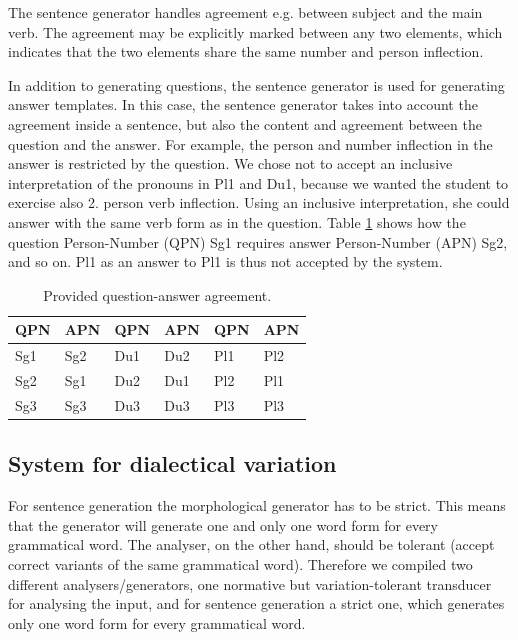 \documentclass[11pt]{article}
\begin{document}
The sentence generator handles agreement e.g. between subject and the main verb. The agreement may be explicitly marked between any two elements, which indicates that the two elements share the same number and person inflection.

In addition to generating questions, the sentence generator is used for generating answer templates. In this case, the sentence generator takes into account the agreement inside a sentence, but also the content and agreement between the question and the answer. For example, the person and number inflection in the answer is restricted by the question. We chose not to accept an inclusive interpretation of the pronouns in Pl1 and Du1, because we wanted the student to exercise also 2. person verb inflection. Using an inclusive interpretation, she could answer with the same verb form as in the question. Table \ref{QA} shows how the question Person-Number (QPN) Sg1 requires answer Person-Number (APN) Sg2, and so on. Pl1 as an answer to Pl1 is thus not accepted by the system.\\


\begin{table}[htdp]
\caption{Provided question-answer agreement.}
\begin{center}
\begin{tabular}[t]{ll|ll|ll}
QPN &APN &QPN &APN &QPN &APN \\
\hline
Sg1 &Sg2 &Du1 &Du2 &Pl1 &Pl2 \\
Sg2 &Sg1 &Du2 &Du1 &Pl2 &Pl1 \\
Sg3 &Sg3 &Du3 &Du3 &Pl3 &Pl3 \\
\hline
\end{tabular}
\end{center}
\label{QA}
\end{table}

\subsection{System for dialectical variation}\label{dialect}
For sentence generation the morphological generator has to be strict. This means that the generator will generate one and only one word form for every grammatical word. The analyser, on the other hand, should be tolerant (accept correct variants of the same grammatical word). Therefore we compiled two different analysers/generators, one normative but variation-tolerant transducer for analysing the input, and for sentence generation a strict one, which generates only one word form for every grammatical word.
\end{document}
